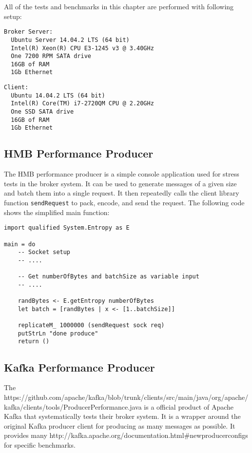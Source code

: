 All of the tests and benchmarks in this chapter are performed with following setup:

\begin{verbatim}
Broker Server: 
  Ubuntu Server 14.04.2 LTS (64 bit)
  Intel(R) Xeon(R) CPU E3-1245 v3 @ 3.40GHz
  One 7200 RPM SATA drive
  16GB of RAM
  1Gb Ethernet
\end{verbatim}

\begin{verbatim}
Client:
  Ubuntu 14.04.2 LTS (64 bit)
  Intel(R) Core(TM) i7-2720QM CPU @ 2.20GHz
  One SSD SATA drive
  16GB of RAM
  1Gb Ethernet
\end{verbatim}

\subsection{HMB Performance Producer}
\label{conc-eval-hmbperformanceprod}

The HMB performance producer is a simple console application used for stress
tests in the broker system. It can be used to generate messages of a given size
and batch them into a single request. It then repeatedly calls the client
library function \lstinline{sendRequest} to pack, encode, and send the request. The following
code shows the simplified main function:

\begin{lstlisting}
import qualified System.Entropy as E

main = do 
    -- Socket setup 
    -- ....

    -- Get numberOfBytes and batchSize as variable input 
    -- ....

    randBytes <- E.getEntropy numberOfBytes 
    let batch = [randBytes | x <- [1..batchSize]]

    replicateM_ 1000000 (sendRequest sock req) 
    putStrLn "done produce"
    return ()

\end{lstlisting}

\subsection{Kafka Performance Producer}
\label{conc-eval-kafkaperformanceprod}

The 
{https://github.com/apache/kafka/blob/trunk/clients/src/main/java/org/apache/kafka/clients/tools/ProducerPerformance.java}
is a official product of Apache Kafka that systematically tests their broker
system. It is a wrapper around the original Kafka producer client for producing
as many messages as possible. It provides many 
{http://kafka.apache.org/documentation.html\#newproducerconfigs} for specific
benchmarks. 

